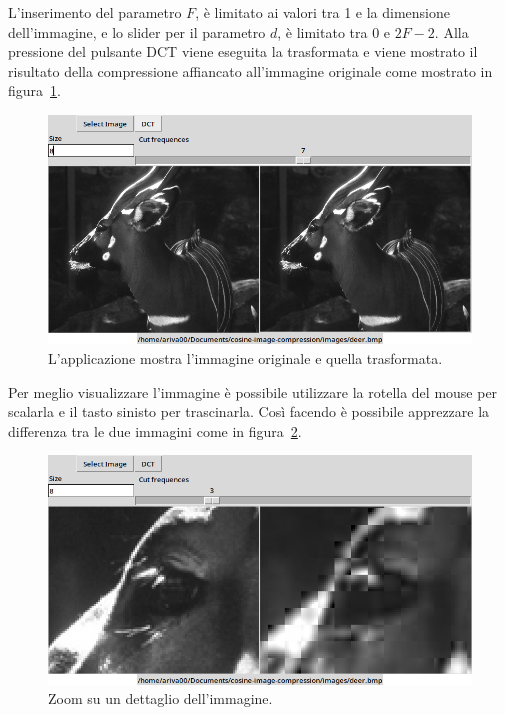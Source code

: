 \documentclass[a4paper, 12pt]{article}
\begin{document}
L'inserimento del parametro $F$, è limitato ai valori tra 1 e la dimensione 
dell'immagine, e lo slider per il parametro $d$, è limitato tra $0$ e $2F-2$.
Alla pressione del pulsante DCT viene eseguita la trasformata e viene mostrato
il risultato della compressione affiancato all'immagine originale come mostrato
in figura~\ref{fig:after-transform}.

\begin{figure}[h]
  \centering
  \includegraphics[width=\textwidth]{./imgs/after-transform.png}
  \caption{L'applicazione mostra l'immagine originale e quella trasformata.}
  \label{fig:after-transform}
\end{figure}

Per meglio visualizzare l'immagine è possibile utilizzare la rotella del mouse 
per scalarla e il tasto sinisto per trascinarla. Così facendo è possibile
apprezzare la differenza tra le due immagini come in 
figura~\ref{fig:zoomed-detail}.

\begin{figure}[h]
  \centering
  \includegraphics[width=\textwidth]{./imgs/zoomed-detail.png}
  \caption{Zoom su un dettaglio dell'immagine.}
  \label{fig:zoomed-detail}
\end{figure}
\end{document}
